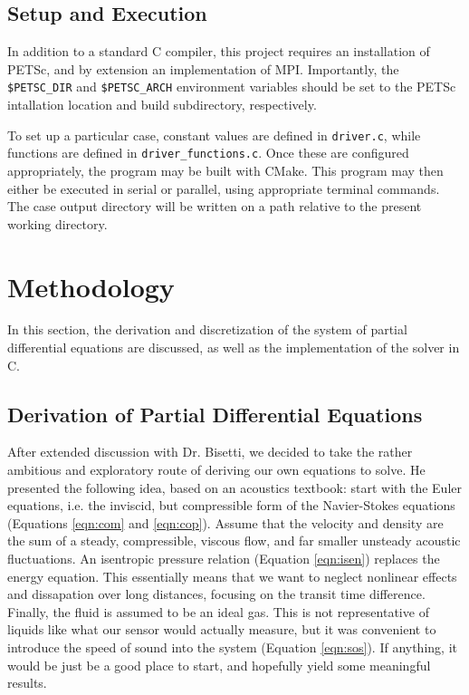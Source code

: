 \documentclass{article}
\begin{document}
\subsection{Setup and Execution}

In addition to a standard C compiler, this project requires an installation of PETSc, and by extension an implementation of MPI. Importantly, the \verb|$PETSC_DIR| and \verb|$PETSC_ARCH| environment variables should be set to the PETSc intallation location and build subdirectory, respectively.

To set up a particular case, constant values are defined in \verb|driver.c|, while functions are defined in \verb|driver_functions.c|. Once these are configured appropriately, the program may be built with CMake. This program may then either be executed in serial or parallel, using appropriate terminal commands. The case output directory will be written on a path relative to the present working directory.

\section{Methodology}

In this section, the derivation and discretization of the system of partial differential equations are discussed, as well as the implementation of the solver in C.

\subsection{Derivation of Partial Differential Equations}

After extended discussion with Dr. Bisetti, we decided to take the rather ambitious and exploratory route of deriving our own equations to solve. He presented the following idea, based on an acoustics textbook: start with the Euler equations, i.e. the inviscid, but compressible form of the Navier-Stokes equations (Equations \ref{eqn:com} and \ref{eqn:cop}). Assume that the velocity and density are the sum of a steady, compressible, viscous flow, and far smaller unsteady acoustic fluctuations. An isentropic pressure relation (Equation \ref{eqn:isen}) replaces the energy equation. This essentially means that we want to neglect nonlinear effects and dissapation over long distances, focusing on the transit time difference. Finally, the fluid is assumed to be an ideal gas. This is not representative of liquids like what our sensor would actually measure, but it was convenient to introduce the speed of sound into the system (Equation \ref{eqn:sos}). If anything, it would be just be a good place to start, and hopefully yield some meaningful results.
\end{document}

